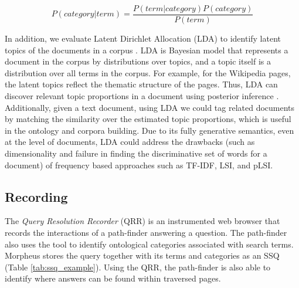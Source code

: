 \begin{equation}
\label{eq:bayesrule}
P (category | term) = \frac{P(term | category) P(category)}{P(term)}
\end{equation}    

In addition, we evaluate Latent Dirichlet Allocation (LDA) to identify latent topics of the documents in a corpus \cite{Blei2003latentdirichlet}.  LDA is Bayesian model that represents a document in the corpus by distributions over topics, and a topic itself is a distribution over all  terms in the corpus.  For example, for the Wikipedia pages, the latent topics reflect the thematic structure of the pages. Thus, LDA can discover relevant topic proportions in a document using posterior inference \cite{Blei2003latentdirichlet}. Additionally, given a text document, using LDA we could tag related documents by matching the similarity over the estimated topic proportions, which is useful in the ontology and corpora building.  Due to its fully generative semantics, even at the level of documents, LDA could address the drawbacks (such as dimensionality and failure in finding the discriminative set of words for a document) of frequency based approaches such as TF-IDF, LSI, and pLSI.


\subsection{ Recording}
\label{sec:query_processing}
  
The \emph{Query Resolution Recorder} (QRR) is an instrumented web browser that records the interactions of a path-finder answering a question. The path-finder also uses the tool to identify ontological categories associated with search terms. Morpheus stores the query together with its terms and categories as an SSQ (Table \ref{tab:ssq_example}). Using the QRR, the path-finder is also able to identify where answers can be found within traversed pages.






